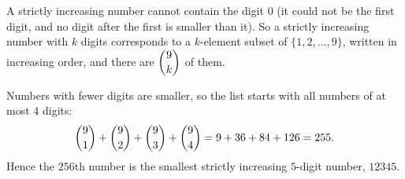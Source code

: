 A strictly increasing number cannot contain the digit $0$ (it could not be the first digit, and no digit after the first is smaller than it). So a strictly increasing number with $k$ digits corresponds to a $k$-element subset of $\{1,2,\dots,9\}$, written in increasing order, and there are $\dbinom9k$ of them.

Numbers with fewer digits are smaller, so the list starts with all numbers of at most $4$ digits:
\[
\dbinom91+\dbinom92+\dbinom93+\dbinom94=9+36+84+126=255 .
\]
Hence the $256$th number is the smallest strictly increasing $5$-digit number, $\boxed{12345}$.
